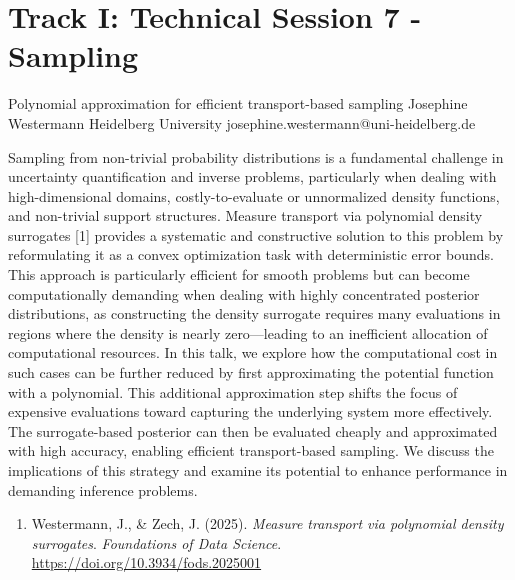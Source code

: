 \section{Track I: Technical Session 7 - Sampling}\newpage

\begin{talk}
  {Polynomial approximation for efficient transport-based sampling}%
  {Josephine Westermann}%
  {Heidelberg University}%
  {josephine.westermann@uni-heidelberg.de}%
  {}%
  {}

Sampling from non-trivial probability distributions is a fundamental challenge in uncertainty quantification and inverse problems, particularly when dealing with high-dimensional domains, costly-to-evaluate or unnormalized density functions, and non-trivial support structures. Measure transport via polynomial density surrogates [1] provides a systematic and constructive solution to this problem by reformulating it as a convex optimization task with deterministic error bounds. This approach is particularly efficient for smooth problems but can become computationally demanding when dealing with highly concentrated posterior distributions, as constructing the density surrogate requires many evaluations in regions where the density is nearly zero—leading to an inefficient allocation of computational resources. In this talk, we explore how the computational cost in such cases can be further reduced by first approximating the potential function with a polynomial. This additional approximation step shifts the focus of expensive evaluations toward capturing the underlying system more effectively. The surrogate-based posterior can then be evaluated cheaply and approximated with high accuracy, enabling efficient transport-based sampling. We discuss the implications of this strategy and examine its potential to enhance performance in demanding inference problems.

\medskip

\begin{enumerate}
 \item[{[1]}] Westermann, J., \& Zech, J. (2025). \textit{Measure transport via polynomial density surrogates}. \textit{Foundations of Data Science}. \url{https://doi.org/10.3934/fods.2025001}
\end{enumerate}

\end{talk}


